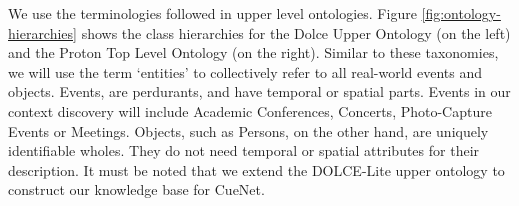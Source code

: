 We use the terminologies followed in upper level ontologies. Figure \ref{fig:ontology-hierarchies} shows the class hierarchies for the Dolce Upper Ontology (on the left) and the Proton Top Level Ontology (on the right). Similar to these taxonomies, we will use the term `entities' to collectively refer to all real-world events and objects. Events, are perdurants, and have temporal or spatial parts. Events in our context discovery will include Academic Conferences, Concerts, Photo-Capture Events or Meetings. Objects, such as Persons, on the other hand, are uniquely identifiable wholes. They do not need temporal or spatial attributes for their description. It must be noted that we extend the DOLCE-Lite upper ontology to construct our knowledge base for CueNet.


